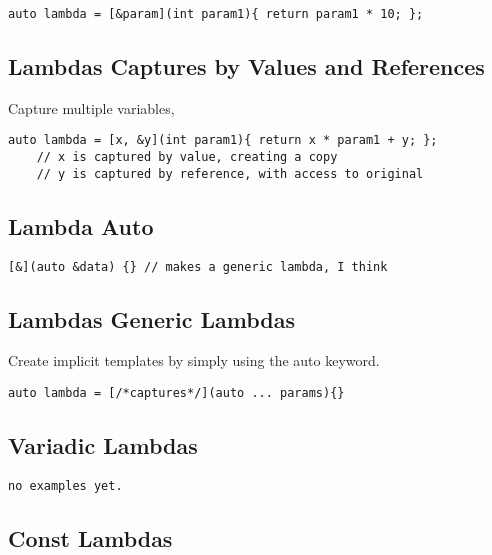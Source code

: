 \begin{verbatim}
auto lambda = [&param](int param1){ return param1 * 10; };
\end{verbatim}

\subsection{Lambdas Captures by Values and References}

Capture multiple variables, 

\begin{verbatim}
auto lambda = [x, &y](int param1){ return x * param1 + y; };
    // x is captured by value, creating a copy
    // y is captured by reference, with access to original
\end{verbatim}

\subsection{Lambda Auto}

\begin{verbatim}
[&](auto &data) {} // makes a generic lambda, I think
\end{verbatim}

\subsection{Lambdas Generic Lambdas}

Create implicit templates by simply using the auto keyword.

\begin{verbatim}
auto lambda = [/*captures*/](auto ... params){}
\end{verbatim}

\subsection{Variadic Lambdas}

\begin{verbatim}
no examples yet.
\end{verbatim}

\subsection{Const Lambdas}

